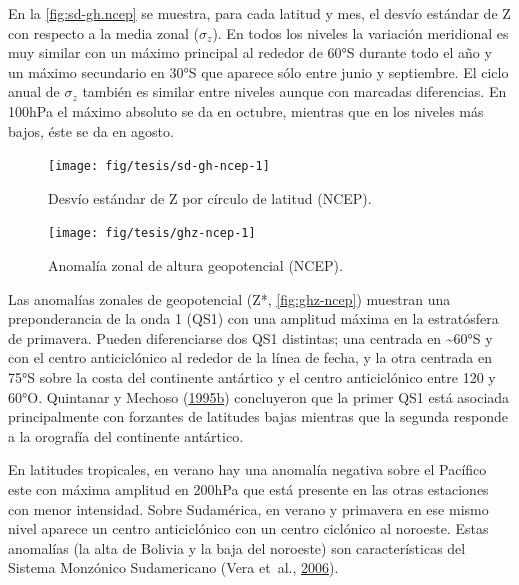\documentclass[spanish,a4paper,12pt,oneside]{book}
\begin{document}
En la \autoref{fig:sd-gh.ncep} se muestra, para cada latitud y mes, el
desvío estándar de Z con respecto a la media zonal (\(\sigma_z\)). En
todos los niveles la variación meridional es muy similar con un máximo
principal al rededor de 60°S durante todo el año y un máximo secundario
en 30°S que aparece sólo entre junio y septiembre. El ciclo anual de
\(\sigma_z\) también es similar entre niveles aunque con marcadas
diferencias. En 100hPa el máximo absoluto se da en octubre, mientras que
en los niveles más bajos, éste se da en agosto.

\begin{figure}
\texttt{[image: fig/tesis/sd-gh-ncep-1]} \caption{Desvío estándar de Z por círculo de latitud (NCEP).}\label{fig:sd-gh-ncep}
\end{figure}

\begin{landscape}\begin{figure}

{\centering \texttt{[image: fig/tesis/ghz-ncep-1]} 

}

\caption{Anomalía zonal de altura geopotencial (NCEP).}\label{fig:ghz-ncep}
\end{figure}
\end{landscape}

Las anomalías zonales de geopotencial (Z*, \autoref{fig:ghz-ncep})
muestran una preponderancia de la onda 1 (QS1) con una amplitud máxima
en la estratósfera de primavera. Pueden diferenciarse dos QS1 distintas;
una centrada en \textasciitilde{}60°S y con el centro anticiclónico al
rededor de la línea de fecha, y la otra centrada en 75°S sobre la costa
del continente antártico y el centro anticiclónico entre 120 y 60°O.
Quintanar y Mechoso
(\protect\hyperlink{ref-Quintanar1995}{1995}\protect\hyperlink{ref-Quintanar1995}{b})
concluyeron que la primer QS1 está asociada principalmente con forzantes
de latitudes bajas mientras que la segunda responde a la orografía del
continente antártico.

En latitudes tropicales, en verano hay una anomalía negativa sobre el
Pacífico este con máxima amplitud en 200hPa que está presente en las
otras estaciones con menor intensidad. Sobre Sudamérica, en verano y
primavera en ese mismo nivel aparece un centro anticiclónico con un
centro ciclónico al noroeste. Estas anomalías (la alta de Bolivia y la
baja del noroeste) son características del Sistema Monzónico
Sudamericano (Vera et~al., \protect\hyperlink{ref-Vera2006}{2006}).
\end{document}
